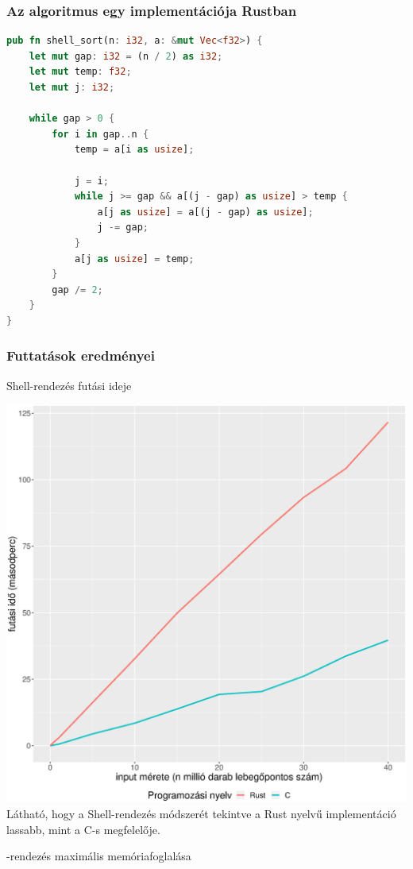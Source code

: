 \subsubsection{Az algoritmus egy implementációja Rustban}
\begin{lstlisting}[language=Rust]
pub fn shell_sort(n: i32, a: &mut Vec<f32>) {
    let mut gap: i32 = (n / 2) as i32;
    let mut temp: f32;
    let mut j: i32;

    while gap > 0 {
        for i in gap..n {
            temp = a[i as usize];

            j = i;
            while j >= gap && a[(j - gap) as usize] > temp {
                a[j as usize] = a[(j - gap) as usize];
                j -= gap;
            }
            a[j as usize] = temp;
        }
        gap /= 2;
    }
}
\end{lstlisting}
\subsubsection{Futtatások eredményei}
Shell-rendezés futási ideje

\includegraphics[width=15.5cm]{kepek/shells_sort_run.eps}
Látható, hogy a Shell-rendezés módszerét tekintve a Rust nyelvű implementáció lassabb, mint a C-s megfelelője.

\noindentShell-rendezés maximális memóriafoglalása

